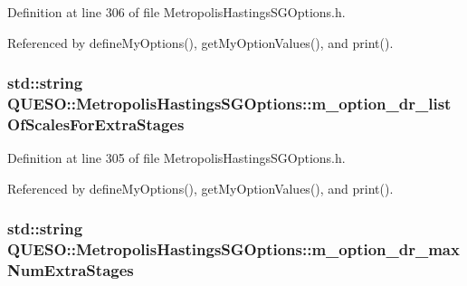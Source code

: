 Definition at line 306 of file Metropolis\-Hastings\-S\-G\-Options.\-h.



Referenced by define\-My\-Options(), get\-My\-Option\-Values(), and print().

\hypertarget{class_q_u_e_s_o_1_1_metropolis_hastings_s_g_options_a23025b02dde1763feed23f53a6549ac0}{
\subsubsection[{m\-\_\-option\-\_\-dr\-\_\-list\-Of\-Scales\-For\-Extra\-Stages}]{\setlength{\rightskip}{0pt plus 5cm}std\-::string Q\-U\-E\-S\-O\-::\-Metropolis\-Hastings\-S\-G\-Options\-::m\-\_\-option\-\_\-dr\-\_\-list\-Of\-Scales\-For\-Extra\-Stages\hspace{0.3cm}{\ttfamily [private]}}}\label{class_q_u_e_s_o_1_1_metropolis_hastings_s_g_options_a23025b02dde1763feed23f53a6549ac0}


Definition at line 305 of file Metropolis\-Hastings\-S\-G\-Options.\-h.



Referenced by define\-My\-Options(), get\-My\-Option\-Values(), and print().

\hypertarget{class_q_u_e_s_o_1_1_metropolis_hastings_s_g_options_a8975cf2f3431edb501ccc94f0c65b2c3}{
\subsubsection[{m\-\_\-option\-\_\-dr\-\_\-max\-Num\-Extra\-Stages}]{\setlength{\rightskip}{0pt plus 5cm}std\-::string Q\-U\-E\-S\-O\-::\-Metropolis\-Hastings\-S\-G\-Options\-::m\-\_\-option\-\_\-dr\-\_\-max\-Num\-Extra\-Stages\hspace{0.3cm}{\ttfamily [private]}}}\label{class_q_u_e_s_o_1_1_metropolis_hastings_s_g_options_a8975cf2f3431edb501ccc94f0c65b2c3}


